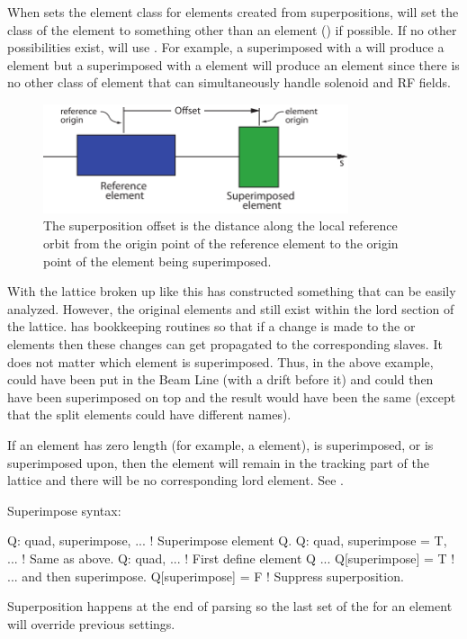 When \bmad sets the element class for elements created from superpositions, \bmad will set the class
of the element to something other than an  element () if possible. If
no other possibilities exist, \bmad will use . For example, a 
superimposed with a  will produce a  element but a 
superimposed with a  element will produce an  element since there is no
other class of element that can simultaneously handle solenoid and RF fields.

  \begin{figure}[tb]
  \centering 
  \includegraphics[width=0.8\textwidth]{superimpose.pdf} 
  \caption[Superposition Offset.]{
The superposition offset is the distance along the local reference orbit from the origin point of the
reference element to the origin point of the element being superimposed.
  }
  \label{f:superimpose}
  \end{figure}

With the lattice broken up like this \bmad has constructed something that can be easily
analyzed. However, the original elements  and  still exist within the lord section of
the lattice. \bmad has bookkeeping routines so that if a change is made to the  or 
elements then these changes can get propagated to the corresponding slaves. It does not matter which
element is superimposed. Thus, in the above example,  could have been put in the Beam Line
(with a drift before it) and  could then have been superimposed on top and the result would
have been the same (except that the split elements could have different names).

If an element has zero length (for example, a  element), is superimposed, or is
superimposed upon, then the element will remain in the tracking part of the lattice and there will
be no corresponding lord element. See .
 
Superimpose syntax:
\begin{example}
  Q: quad, superimpose, ...       ! Superimpose element Q.
  Q: quad, superimpose = T, ...   ! Same as above.
  Q: quad, ...                    ! First define element Q ...
  Q[superimpose] = T              !   ... and then superimpose.
  Q[superimpose] = F              ! Suppress superposition.
\end{example}
Superposition happens at the end of parsing so the last set of the  for an element
will override previous settings. 

